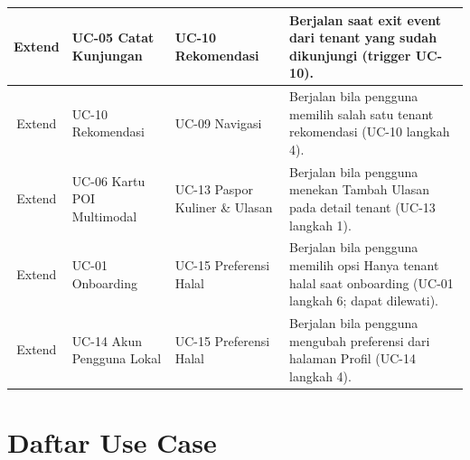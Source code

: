 \begin{longtable}{|C{0.11}|L{0.19}|L{0.19}|L{0.51}|}
Extend & UC-05 Catat Kunjungan & UC-10 Rekomendasi & Berjalan saat exit event dari tenant yang sudah dikunjungi (trigger UC-10). \\ \hline
Extend & UC-10 Rekomendasi & UC-09 Navigasi & Berjalan bila pengguna memilih salah satu tenant rekomendasi (UC-10 langkah 4). \\ \hline
Extend & UC-06 Kartu POI Multimodal & UC-13 Paspor Kuliner \& Ulasan & Berjalan bila pengguna menekan Tambah Ulasan pada detail tenant (UC-13 langkah 1). \\ \hline
Extend & UC-01 Onboarding & UC-15 Preferensi Halal & Berjalan bila pengguna memilih opsi Hanya tenant halal saat onboarding (UC-01 langkah 6; dapat dilewati). \\ \hline
Extend & UC-14 Akun Pengguna Lokal & UC-15 Preferensi Halal & Berjalan bila pengguna mengubah preferensi dari halaman Profil (UC-14 langkah 4). \\ \hline
\end{longtable}


\clearpage
\section{Daftar Use Case}

